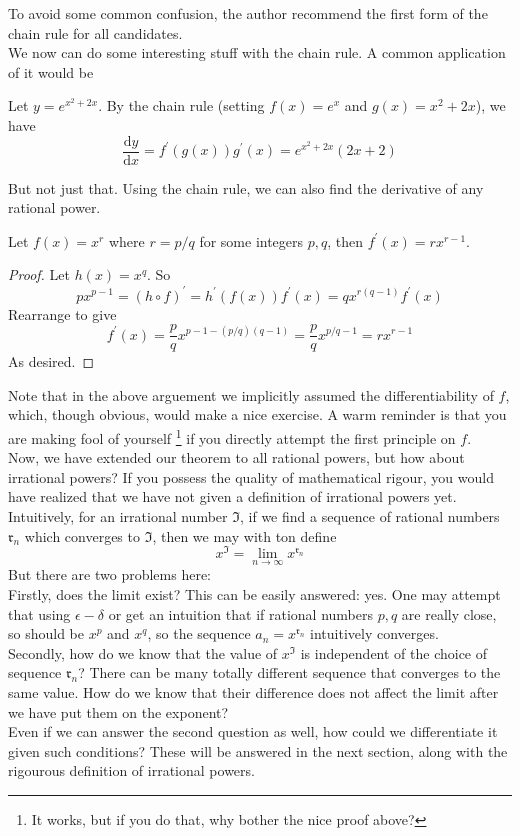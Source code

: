 To avoid some common confusion, the author recommend the first form of the chain rule for all candidates.\\
We now can do some interesting stuff with the chain rule.
A common application of it would be
\begin{example}
    Let $y=e^{x^2+2x}$. By the chain rule (setting $f(x)=e^x$ and $g(x)=x^2+2x$), we have
    $$\frac{\mathrm dy}{\mathrm dx}=f^\prime(g(x))g^\prime(x)=e^{x^2+2x}(2x+2)$$
\end{example}
But not just that.
Using the chain rule, we can also find the derivative of any rational power.
\begin{theorem}
    Let $f(x)=x^r$ where $r=p/q$ for some integers $p,q$, then $f^\prime(x)=rx^{r-1}$.
\end{theorem}
\begin{proof}
    Let $h(x)=x^q$.
    So
    $$px^{p-1}=(h\circ f)^\prime=h^\prime(f(x))f^\prime(x)=qx^{r(q-1)}f^\prime(x)$$
    Rearrange to give
    $$f^\prime(x)=\frac{p}{q}x^{p-1-(p/q)(q-1)}=\frac{p}{q}x^{p/q-1}=rx^{r-1}$$
    As desired.
\end{proof}
Note that in the above arguement we implicitly assumed the differentiability of $f$, which, though obvious, would make a nice exercise.
A warm reminder is that you are making fool of yourself
\footnote{It works, but if you do that, why bother the nice proof above?}
if you directly attempt the first principle on $f$.\\
Now, we have extended our theorem to all rational powers, but how about irrational powers?
If you possess the quality of mathematical rigour, you would have realized that we have not given a definition of irrational powers yet.
Intuitively, for an irrational number $\mathfrak{I}$, if we find a sequence of rational numbers $\mathfrak{r}_n$ which converges to $\mathfrak{I}$, then we may with ton define
$$x^{\mathfrak{I}}=\lim_{n\to\infty}x^{\mathfrak{r}_n}$$
But there are two problems here:\\
Firstly, does the limit exist?
This can be easily answered: yes.
One may attempt that using $\epsilon-\delta$ or get an intuition that if rational numbers $p,q$ are really close, so should be $x^p$ and $x^q$, so the sequence $a_n=x^{\mathfrak{r}_n}$ intuitively converges.\\
Secondly, how do we know that the value of $x^\mathfrak{I}$ is independent of the choice of sequence $\mathfrak{r}_n$?
There can be many totally different sequence that converges to the same value.
How do we know that their difference does not affect the limit after we have put them on the exponent?\\
Even if we can answer the second question as well, how could we differentiate it given such conditions?
These will be answered in the next section, along with the rigourous definition of irrational powers. 
